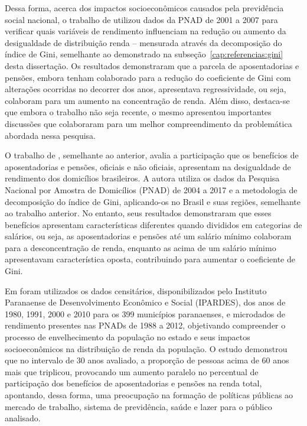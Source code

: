Dessa forma, acerca dos impactos socioeconômicos causados pela previdência social nacional, o trabalho de \cite{cap02_ref22} utilizou dados da PNAD de 2001 a 2007 para verificar quais variáveis de rendimento influenciam na redução ou aumento da desigualdade de distribuição renda – mensurada através da decomposição do índice de Gini, semelhante ao demonstrado na subseção~\ref{cap:referencias:gini} desta dissertação. Os resultados demonstraram que a parcela de aposentadorias e pensões, embora tenham colaborado para a redução do coeficiente de Gini com alterações ocorridas no decorrer dos anos, apresentava regressividade, ou seja, colaboram para um aumento na concentração de renda. Além disso, destaca-se que embora o trabalho não seja recente, o mesmo apresentou importantes discussões que colaboraram para um melhor compreendimento da problemática abordada nessa pesquisa.

O trabalho de \cite{cap04_ref11}, semelhante ao anterior, avalia a participação que os benefícios de aposentadorias e pensões, oficiais e não oficiais, apresentam na desigualdade de rendimento dos domicílios brasileiros. A autora utiliza os dados da Pesquisa Nacional por Amostra de Domicílios (PNAD) de 2004 a 2017 e a metodologia de decomposição do índice de Gini, aplicando-os no Brasil e suas regiões, semelhante ao trabalho anterior. No entanto, seus resultados demonstraram que esses benefícios apresentam características diferentes quando divididos em categorias de salários, ou seja, as aposentadorias e pensões até um salário mínimo colaboram para a desconcentração de renda, enquanto as acima de um salário mínimo apresentavam característica oposta, contribuindo para aumentar o coeficiente de Gini. 

Em \cite{cap03_ref3} foram utilizados os dados censitários, disponibilizados pelo Instituto Paranaense de Desenvolvimento Econômico e Social (IPARDES), dos anos de 1980, 1991, 2000 e 2010 para os 399 municípios paranaenses, e microdados de rendimento presentes nas PNADs de 1988 a 2012, objetivando compreender o processo de envelhecimento da população no estado e seus impactos socioeconômicos na distribuição de renda da população. O estudo demonstrou que no intervalo de 30 anos avaliado, a proporção de pessoas acima de 60 anos mais que triplicou, provocando um aumento paralelo no percentual de participação dos benefícios de aposentadorias e pensões na renda total, apontando, dessa forma, uma preocupação na formação de políticas públicas ao mercado de trabalho, sistema de previdência, saúde e lazer para o público analisado.

